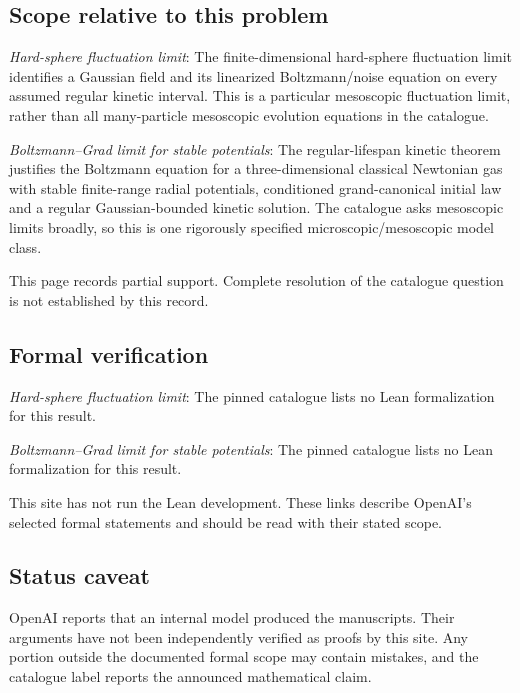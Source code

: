 \documentclass[11pt]{article}
\begin{document}
\subsection{Scope relative to this problem}
\textit{Hard-sphere fluctuation limit}: The finite-dimensional hard-sphere fluctuation limit identifies a Gaussian field and its linearized Boltzmann/noise equation on every assumed regular kinetic interval. This is a particular mesoscopic fluctuation limit, rather than all many-particle mesoscopic evolution equations in the catalogue.

\textit{Boltzmann--Grad limit for stable potentials}: The regular-lifespan kinetic theorem justifies the Boltzmann equation for a three-dimensional classical Newtonian gas with stable finite-range radial potentials, conditioned grand-canonical initial law and a regular Gaussian-bounded kinetic solution. The catalogue asks mesoscopic limits broadly, so this is one rigorously specified microscopic/mesoscopic model class.

This page records partial support. Complete resolution of the catalogue question is not established by this record.

\subsection{Formal verification}
\textit{Hard-sphere fluctuation limit}: The pinned catalogue lists no Lean formalization for this result.

\textit{Boltzmann--Grad limit for stable potentials}: The pinned catalogue lists no Lean formalization for this result.

This site has not run the Lean development. These links describe OpenAI’s selected formal statements and should be read with their stated scope.

\subsection{Status caveat}
OpenAI reports that an internal model produced the manuscripts. Their arguments have not been independently verified as proofs by this site. Any portion outside the documented formal scope may contain mistakes, and the catalogue label reports the announced mathematical claim.
\end{document}
